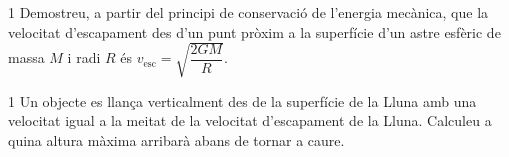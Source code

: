 \begin{apartat}{1}
Demostreu, a partir del principi de conservació de l'energia mecànica, que la velocitat d'escapament des d'un punt pròxim a la superfície d'un astre esfèric de massa $M$ i radi $R$ és $v_\mathrm{esc} = \sqrt{\dfrac{2GM}{R}}$.
\end{apartat}

\begin{apartat}{1}
Un objecte es llança verticalment des de la superfície de la Lluna amb una velocitat igual a la meitat de la velocitat d'escapament de la Lluna. Calculeu a quina altura màxima arribarà abans de tornar a caure.
\end{apartat}

